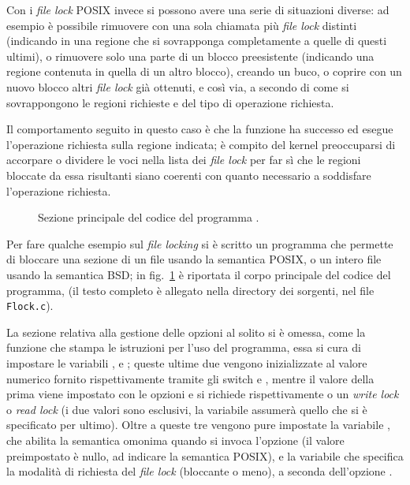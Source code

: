 Con i \textit{file lock} POSIX invece si possono avere una serie di situazioni
diverse: ad esempio è possibile rimuovere con una sola chiamata più
\textit{file lock} distinti (indicando in una regione che si sovrapponga
completamente a quelle di questi ultimi), o rimuovere solo una parte di un
blocco preesistente (indicando una regione contenuta in quella di un altro
blocco), creando un buco, o coprire con un nuovo blocco altri \textit{file
  lock} già ottenuti, e così via, a secondo di come si sovrappongono le
regioni richieste e del tipo di operazione richiesta.

Il comportamento seguito in questo caso è che la funzione ha successo ed
esegue l'operazione richiesta sulla regione indicata; è compito del kernel
preoccuparsi di accorpare o dividere le voci nella lista dei \textit{file
  lock} per far sì che le regioni bloccate da essa risultanti siano coerenti
con quanto necessario a soddisfare l'operazione richiesta.

\begin{figure}[!htbp]
  \footnotesize \centering
  \begin{minipage}[c]{\codesamplewidth}
  \end{minipage}
  \normalsize 
  \caption{Sezione principale del codice del programma .}
  \label{fig:file_flock_code}
\end{figure}

Per fare qualche esempio sul \textit{file locking} si è scritto un programma che
permette di bloccare una sezione di un file usando la semantica POSIX, o un
intero file usando la semantica BSD; in fig.~\ref{fig:file_flock_code} è
riportata il corpo principale del codice del programma, (il testo completo è
allegato nella directory dei sorgenti, nel file \texttt{Flock.c}).

La sezione relativa alla gestione delle opzioni al solito si è omessa, come la
funzione che stampa le istruzioni per l'uso del programma, essa si cura di
impostare le variabili ,  e ; queste ultime due
vengono inizializzate al valore numerico fornito rispettivamente tramite gli
switch  e , mentre il valore della prima viene impostato con
le opzioni  e  si richiede rispettivamente o un \textit{write
  lock} o \textit{read lock} (i due valori sono esclusivi, la variabile
assumerà quello che si è specificato per ultimo). Oltre a queste tre vengono
pure impostate la variabile , che abilita la semantica omonima quando
si invoca l'opzione  (il valore preimpostato è nullo, ad indicare la
semantica POSIX), e la variabile  che specifica la modalità di
richiesta del \textit{file lock} (bloccante o meno), a seconda dell'opzione
.

